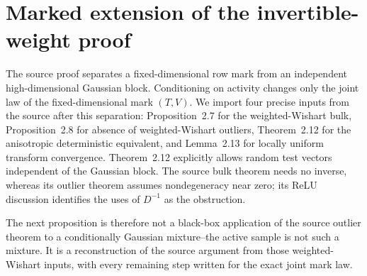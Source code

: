\section{Marked extension of the invertible-weight proof}

The source proof \cite{BenArousEtAl2025} separates a fixed-dimensional row
mark from an independent high-dimensional Gaussian block. Conditioning on
activity changes only the joint law of the fixed-dimensional mark $(T,V)$.
We import four precise inputs from the source after this separation:
Proposition~2.7 for the weighted-Wishart bulk, Proposition~2.8 for absence
of weighted-Wishart outliers, Theorem~2.12 for the anisotropic deterministic
equivalent, and Lemma~2.13 for locally uniform transform convergence.
Theorem~2.12 explicitly allows random test vectors independent of the
Gaussian block. The source bulk theorem needs no inverse, whereas its
outlier theorem assumes nondegeneracy near zero; its ReLU discussion
identifies the uses of $D^{-1}$ as the obstruction.

The next proposition is therefore not a black-box application of the source
outlier theorem to a conditionally Gaussian mixture--the active sample is not
such a mixture. It is a reconstruction of the source argument from those
weighted-Wishart inputs, with every remaining step written for the exact joint
mark law.

